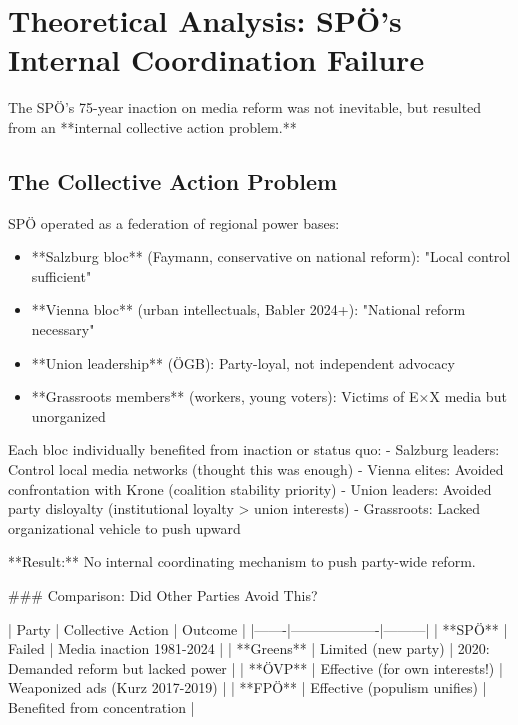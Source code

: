 
\section*{Theoretical Analysis: SPÖ's Internal Coordination Failure}

The SPÖ's 75-year inaction on media reform was not inevitable, but resulted from
an **internal collective action problem.**

\subsection*{The Collective Action Problem}

SPÖ operated as a federation of regional power bases:

\begin{itemize}
\item **Salzburg bloc** (Faymann, conservative on national reform): "Local control sufficient"
\item **Vienna bloc** (urban intellectuals, Babler 2024+): "National reform necessary"
\item **Union leadership** (ÖGB): Party-loyal, not independent advocacy
\item **Grassroots members** (workers, young voters): Victims of E×X media but unorganized
\end{itemize}

Each bloc individually benefited from inaction or status quo:
- Salzburg leaders: Control local media networks (thought this was enough)
- Vienna elites: Avoided confrontation with Krone (coalition stability priority)
- Union leaders: Avoided party disloyalty (institutional loyalty > union interests)
- Grassroots: Lacked organizational vehicle to push upward

**Result:** No internal coordinating mechanism to push party-wide reform.

### Comparison: Did Other Parties Avoid This?

| Party | Collective Action | Outcome |
|-------|-------------------|---------|
| **SPÖ** | Failed | Media inaction 1981-2024 |
| **Greens** | Limited (new party) | 2020: Demanded reform but lacked power |
| **ÖVP** | Effective (for own interests!) | Weaponized ads (Kurz 2017-2019) |
| **FPÖ** | Effective (populism unifies) | Benefited from concentration |

